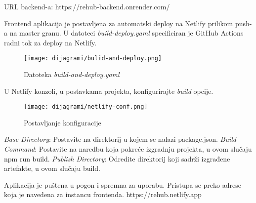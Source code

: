 URL backend-a: https://rehub-backend.onrender.com/



Frontend aplikacija je postavljena za automatski deploy na Netlify prilikom push-a na master granu. U datoteci \textit{build-deploy.yaml} specificiran je GitHub Actions radni tok za deploy na Netlify. 	

\begin{figure}[H]
	\texttt{[image: dijagrami/bulid-and-deploy.png]}
	\centering
	\caption{Datoteka \textit{build-and-deploy.yaml}}
	\label{fig:build-and-deploy}
\end{figure}



U Netlify konzoli, u postavkama projekta, konfigurirajte \textit{build} opcije.

\begin{figure}[H]
	\texttt{[image: dijagrami/netlify-conf.png]}
	\centering
	\caption{Postavljanje konfiguracije}
	\label{fig:netlify-conf}
\end{figure}

\textit{Base Directory}: Postavite na direktorij u kojem se nalazi package.json.
\textit{Build Command}: Postavite na naredbu koja pokreće izgradnju projekta, u ovom slučaju npm run build.
\textit{Publish Directory}: Odredite direktorij koji sadrži izgrađene artefakte, u ovom slučaju build.



Aplikacija je puštena u pogon i spremna za uporabu. Pristupa se preko adrese koja je navedena za instancu frontenda.
https://rehub.netlify.app

\eject
